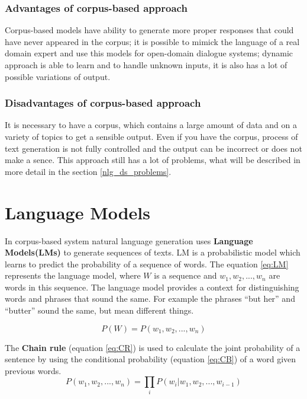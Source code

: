 \subsubsection{Advantages of corpus-based approach}
Corpus-based models have ability to generate more proper responses that could have never appeared in the corpus; it is possible to mimick the language of a real domain expert and use this models for open-domain dialogue systems; dynamic approach is able to learn and to handle unknown inputs, it is also has a lot of possible variations of output.

\subsubsection{Disadvantages of corpus-based approach}
It is necessary to have a corpus, which contains a large amount of data and on a variety of topics to get a sensible output. Even if you have the corpus, process of text generation is not fully controlled and the output can be incorrect or does not make a sence. This approach still has a lot of problems, what will be described in more detail in the section \ref{nlg_ds_problems}. 

\section{Language Models}
In corpus-based system natural language generation uses \textbf{Language Models(LMs)} to generate sequences of texts. LM is a probabilistic model which learns to predict the probability of a sequence of words. The equation \ref{eq:LM} represents the language model, where $W$ is a sequence and $w_1, w_2, ..., w_n$ are words in this sequence. The language model provides a context for distinguishing words and phrases that sound the same. For example the phrases ``but her'' and  ``butter'' sound the same, but mean different things.

\begin{equation} \label{eq:LM}
P(W) = P(w_1, w_2, ..., w_n)
\end{equation}

The \textbf{Chain rule} (equation \ref{eq:CR}) is used to calculate the joint probability of a sentence by using the conditional probability (equation \ref{eq:CB}) of a word given previous words. 
\begin{equation} \label{eq:CR}
P(w_1, w_2,..., w_n) = \prod_{i}P(w_i|w_1, w_2,...,w_{i-1})
\end{equation}

